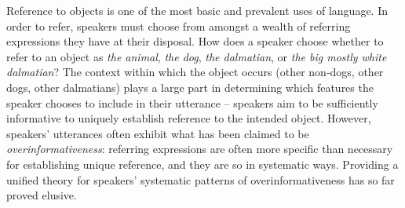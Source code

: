 \documentclass[11pt]{article}
\begin{document}
Reference to objects is one of the most basic and prevalent uses of language. In order to refer, speakers must choose from amongst a wealth of referring expressions they have at their disposal. How does a speaker choose whether to refer to an object as \emph{the animal}, \emph{the dog}, \emph{the dalmatian}, or \emph{the big mostly white dalmatian}? The context within which the object occurs (other non-dogs, other dogs, other dalmatians) plays a large part in determining which features the speaker chooses to include in their utterance -- speakers aim to be sufficiently informative to uniquely establish reference to the intended object. However, speakers' utterances often exhibit what has been claimed to be \emph{overinformativeness}: referring expressions are often more specific than necessary for establishing unique reference, and they are so in systematic ways. Providing a unified theory for speakers' systematic patterns of overinformativeness has so far proved elusive.
\end{document}
